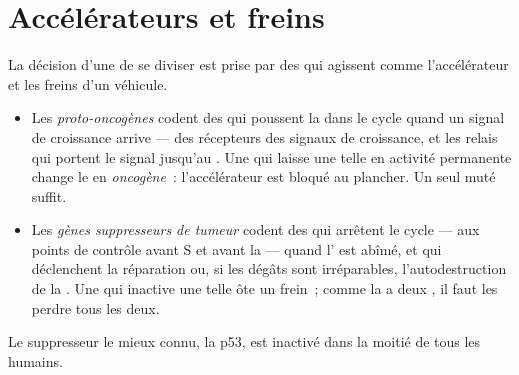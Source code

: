 \section{Accélérateurs et freins}

\begin{proposition}\label{prop:g11:cancer:genes}
La décision d'une  de se diviser est prise par des  qui
agissent comme l'accélérateur et les freins d'un véhicule.
\begin{itemize}
  \item Les \emph{proto-oncogènes} codent des
         qui poussent la  dans le cycle quand un signal
        de croissance arrive --- des récepteurs des signaux de
        croissance, et les relais qui portent le signal jusqu'au .
        Une  qui laisse une telle  en activité
        permanente change le  en \emph{oncogène}~: l'accélérateur
        est bloqué au plancher. Un seul  muté suffit.
  \item Les \emph{gènes suppresseurs de tumeur}
        codent des  qui arrêtent le cycle --- aux points de
        contrôle avant S et avant la  --- quand l' est abîmé,
        et qui déclenchent la réparation ou, si les dégâts sont
        irréparables, l'autodestruction de la . Une  qui
        inactive une telle  ôte un frein~; comme la  a
        deux , il faut les perdre tous les deux.
\end{itemize}
Le suppresseur le mieux connu, la  p53, est inactivé dans la
moitié de tous les  humains.
\end{proposition}
\admitted

